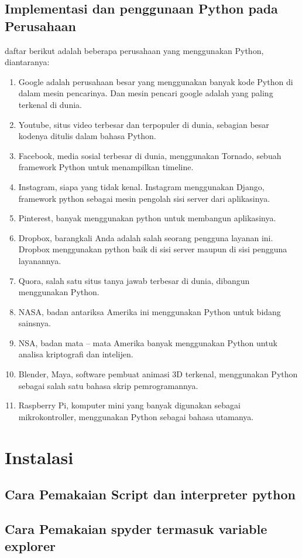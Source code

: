 \subsection{Implementasi dan penggunaan Python pada Perusahaan}
daftar berikut adalah beberapa perusahaan yang menggunakan Python, diantaranya:
\begin{enumerate}
\item
Google adalah perusahaan besar yang menggunakan banyak kode Python di dalam mesin pencarinya. Dan mesin pencari google adalah yang paling terkenal di dunia.
\item
Youtube, situs video terbesar dan terpopuler di dunia, sebagian besar kodenya ditulis dalam bahasa Python.
\item
Facebook, media sosial terbesar di dunia, menggunakan Tornado, sebuah framework Python untuk menampilkan timeline.
\item
Instagram, siapa yang tidak kenal. Instagram menggunakan Django, framework python sebagai mesin pengolah sisi server dari aplikasinya.
\item
Pinterest, banyak menggunakan python untuk membangun aplikasinya.
\item
Dropbox, barangkali Anda adalah salah seorang pengguna layanan ini. Dropbox menggunakan python baik di sisi server maupun di sisi pengguna layanannya.
\item
Quora, salah satu situs tanya jawab terbesar di dunia, dibangun menggunakan Python.
\item
NASA, badan antariksa Amerika ini menggunakan Python untuk bidang sainsnya.
\item
NSA, badan mata – mata Amerika banyak menggunakan Python untuk analisa kriptografi dan intelijen.
\item
Blender, Maya, software pembuat animasi 3D terkenal, menggunakan Python sebagai salah satu bahasa skrip pemrogramannya.
\item
Raspberry Pi, komputer mini yang banyak digunakan sebagai mikrokontroller, menggunakan Python sebagai bahasa utamanya.
\end{enumerate}


\section{Instalasi}
\subsection{Cara Pemakaian Script dan interpreter python}
\subsection{Cara Pemakaian spyder termasuk variable explorer}

